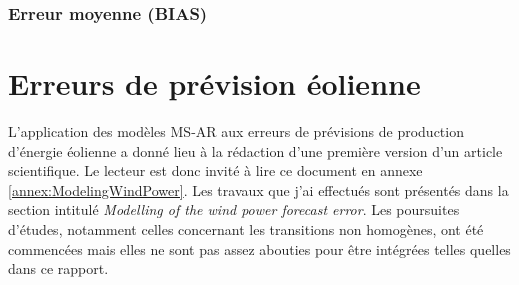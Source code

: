 \documentclass[12pt]{report}
\begin{document}
\subsection{Erreur moyenne (BIAS)}
\label{subsec:Model_Metric_BIAS}
%
%
 


\chapter{Erreurs de prévision éolienne}
\label{seq:ResultatsEolien}

L'application des modèles MS-AR aux erreurs de prévisions de production d'énergie éolienne a donné lieu à la rédaction d'une première version d'un article scientifique. Le lecteur est donc invité à lire ce document en annexe \ref{annex:ModelingWindPower}. Les travaux que j'ai effectués sont présentés dans la section intitulé \textit{Modelling of the wind power forecast error}. Les poursuites d'études, notamment celles concernant les transitions non homogènes, ont été commencées mais elles ne sont pas assez abouties pour être intégrées telles quelles dans ce rapport.
\end{document}
